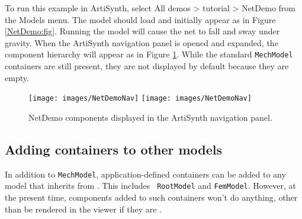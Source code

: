 To run this example in ArtiSynth, select {\sf All demos > tutorial >
NetDemo} from the {\sf Models} menu. The model should load and
initially appear as in Figure \ref{NetDemo:fig}.  Running the model
will cause the net to fall and sway under gravity. When the ArtiSynth
navigation panel is opened and expanded, the component hierarchy will
appear as in Figure \ref{NetDemoNav:fig}. While the standard
{\tt MechModel} containers are still present, they are not displayed
by default because they are empty.

\begin{figure}[ht]
\begin{center}
\iflatexml
 \texttt{[image: images/NetDemoNav]}
\else
 \texttt{[image: images/NetDemoNav]}
\fi
\end{center}
\caption{NetDemo components displayed in the ArtiSynth navigation panel.}
\label{NetDemoNav:fig}
\end{figure}

\subsection{Adding containers to other models}

In addition to {\tt MechModel}, application-defined containers can be
added to any model that inherits from
. This includes {\tt
RootModel} and {\tt FemModel}. However, at the present time,
components added to such containers won't do anything, other than be
rendered in the viewer if they are
.

